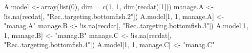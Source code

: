 \begin{Schunk}
\begin{Sinput}
 A.model <- array(list(0), dim = c(1, 1, dim(recdat)[1]))
 manage.A <- !is.na(recdat[, "Rec..targeting.bottomfish.2"])
 A.model[1, 1, manage.A] <- "manag.A"
 manage.B <- !is.na(recdat[, "Rec..targeting.bottomfish.3"])
 A.model[1, 1, manage.B] <- "manag.B"
 manage.C <- !is.na(recdat[, "Rec..targeting.bottomfish.4"])
 A.model[1, 1, manage.C] <- "manag.C"
\end{Sinput}
\end{Schunk}
